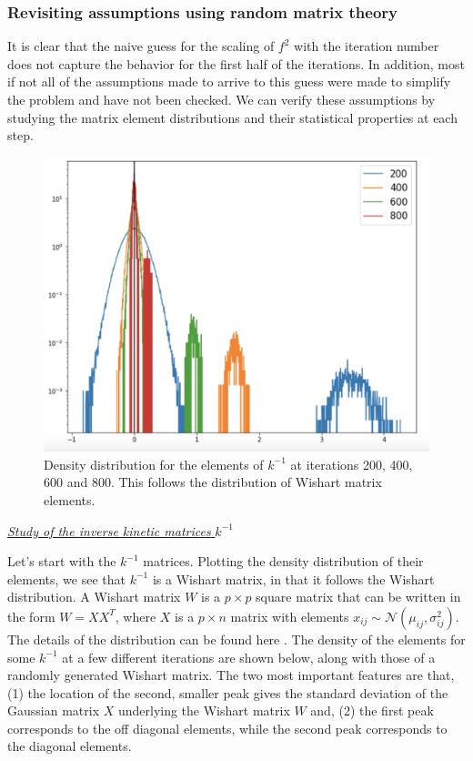 \documentclass[11pt]{article}
\begin{document}
\subsubsection{Revisiting assumptions using random matrix theory}

It is clear that the naive guess for the scaling of $f^2$ with the iteration number does not capture the behavior for the first half of the iterations. In addition, most if not all of the assumptions made to arrive to this guess were made to simplify the problem and have not been checked. We can verify these assumptions by studying the matrix element distributions and their statistical properties at each step.


\begin{figure}[h]
    \centering
    \includegraphics[width=0.75\linewidth]{figs/kinv-distributions.png}
    \caption{Density distribution for the elements of $k^{-1}$ at iterations 200, 400, 600 and 800. This follows the distribution of Wishart matrix elements.}
    \label{fig:kinv-dist}
\end{figure}

\begin{center}
    \underline{\textit{Study of the inverse kinetic matrices} $k^{-1}$}
\end{center}

Let's start with the $k^{-1}$ matrices. Plotting the density distribution of their elements, we see that $k^{-1}$ is a Wishart matrix, in that it follows the Wishart distribution. A Wishart matrix $W$ is a $p\times p$ square matrix that can be written in the form $W = XX^T$, where $X$ is a $p \times n$ matrix with elements $x_{ij} \sim \mathcal{N}(\mu_{ij},\sigma_{ij} ^2)$. The details of the distribution can be found here \cite{RMTguide}. The density of the elements for some $k^{-1}$ at a few different iterations are shown below, along with those of a randomly generated Wishart matrix. The two most important features are that, (1) the location of the second, smaller peak gives the standard deviation of the Gaussian matrix $X$ underlying the Wishart matrix $W$ and, (2) the first peak corresponds to the off diagonal elements, while the second peak corresponds to the diagonal elements. 
\end{document}
